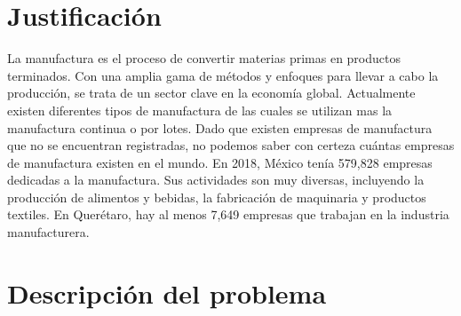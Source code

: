     \section{Justificación}
    
    La manufactura es el proceso de convertir materias primas en productos terminados. Con una amplia gama de métodos y enfoques para llevar a cabo la producción, se trata de un sector clave en la economía global.
    Actualmente existen diferentes tipos de manufactura de las cuales se utilizan mas la manufactura continua o por lotes. 
    Dado que existen empresas de manufactura que no se encuentran registradas, no podemos saber con certeza cuántas empresas de manufactura existen en el mundo. 
    En 2018, México tenía 579,828 empresas dedicadas a la manufactura. Sus actividades son muy diversas, incluyendo la producción de alimentos y bebidas, la fabricación de maquinaria y productos textiles.
    En Querétaro, hay al menos 7,649 empresas que trabajan en la industria manufacturera.
    \section{Descripción del problema}
    

